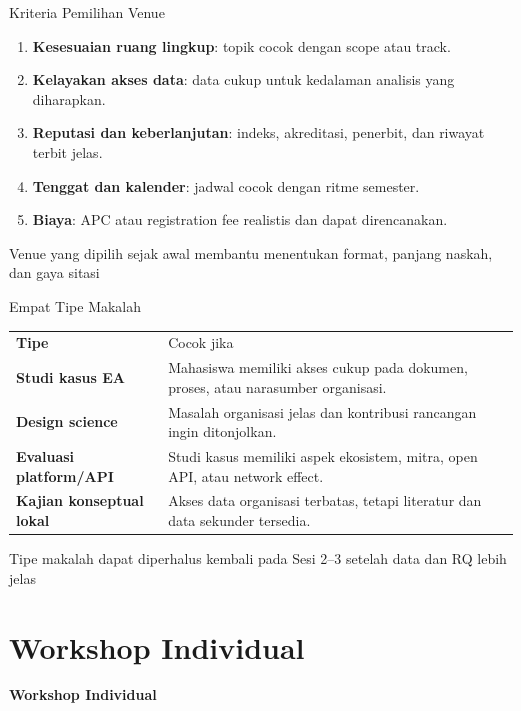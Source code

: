 \documentclass[aspectratio=169, table]{beamer}
\newcommand{\sectionframe}[1]{%
  \begin{frame}{\hfill}
    \centering
    \Huge{\textbf{#1}}
  \end{frame}
}
\newcommand{\takeaway}[1]{%
  \vspace{4pt}
  {\footnotesize #1}
}
\begin{document}
\begin{frame}{Kriteria Pemilihan Venue}
  \vspace{8pt}
  \begin{enumerate}
    \item \textbf{Kesesuaian ruang lingkup}: topik cocok dengan scope atau track.
    \item \textbf{Kelayakan akses data}: data cukup untuk kedalaman analisis yang diharapkan.
    \item \textbf{Reputasi dan keberlanjutan}: indeks, akreditasi, penerbit, dan riwayat terbit jelas.
    \item \textbf{Tenggat dan kalender}: jadwal cocok dengan ritme semester.
    \item \textbf{Biaya}: APC atau registration fee realistis dan dapat direncanakan.
  \end{enumerate}

  \takeaway{Venue yang dipilih sejak awal membantu menentukan format, panjang naskah, dan gaya sitasi}
\end{frame}

\begin{frame}{Empat Tipe Makalah}
  \vspace{6pt}
  \small
  \begin{tabularx}{\textwidth}{>{\bfseries}p{}X}
    \rowcolor{praditagreen!18}
    Tipe & Cocok jika \\
    Studi kasus EA & Mahasiswa memiliki akses cukup pada dokumen, proses, atau narasumber organisasi. \\
    Design science & Masalah organisasi jelas dan kontribusi rancangan ingin ditonjolkan. \\
    Evaluasi platform/API & Studi kasus memiliki aspek ekosistem, mitra, open API, atau network effect. \\
    Kajian konseptual lokal & Akses data organisasi terbatas, tetapi literatur dan data sekunder tersedia. \\
  \end{tabularx}

  \takeaway{Tipe makalah dapat diperhalus kembali pada Sesi 2--3 setelah data dan RQ lebih jelas}
\end{frame}

\section{Workshop Individual}
\sectionframe{Workshop Individual}
\end{document}
